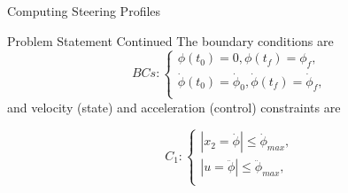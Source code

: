 \documentclass{beamer}
\begin{document}
\begin{frame}{Computing Steering Profiles}
\begin{block}{ Problem Statement Continued}
The boundary conditions are
\begin{equation}\label{Bcs}
 BCs:\left\{
                \begin{array}{l}
                \phi(t_0)=0, \phi(t_f)=\phi_{f},\\
               \dot{\phi}(t_0)=\dot{\phi}_{0},\dot{ \phi}(t_f)=\dot{\phi}_{f}, \\
                \end{array}
              \right.
 \end{equation}
and velocity (state) and acceleration (control) constraints are

\begin{equation}\label{constraints1}
 C_1:\left\{
                \begin{array}{l}
               |x_2=\dot{\phi}|\leq \dot{\phi}_{max},\\
              |u=\ddot{\phi}|\leq \ddot{\phi}_{max},\\
                \end{array}
              \right.
 \end{equation}
%
%


\end{block}
\end{frame}
\end{document}
